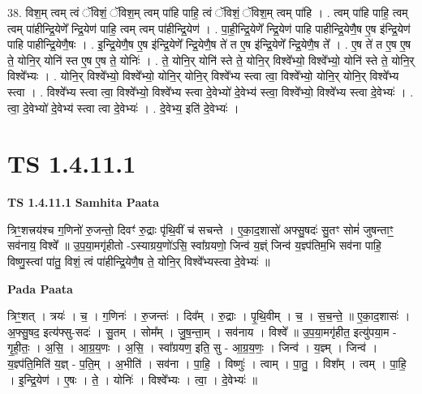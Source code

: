 \documentclass[17pt]{extarticle}
\begin{document}
38. विश॒म् त्वम् त्वं ॅविशं॒ ॅविश॒म् त्वम् पा॑हि पाहि॒ त्वं ॅविशं॒ ॅविश॒म् त्वम् पा॑हि । . त्वम् पा॑हि पाहि॒ त्वम् त्वम् पा॑हीन्द्रि॒येणे᳚ न्द्रि॒येण॑ पाहि॒ त्वम् त्वम् पा॑हीन्द्रि॒येण॑ । . पा॒ही॒न्द्रि॒येणे᳚ न्द्रि॒येण॑ पाहि पाहीन्द्रि॒येणै॒ष ए॒ष इ॑न्द्रि॒येण॑ पाहि पाहीन्द्रि॒येणै॒षः । . इ॒न्द्रि॒येणै॒ष ए॒ष इ॑न्द्रि॒येणे᳚ न्द्रि॒येणै॒ष ते॑ त ए॒ष इ॑न्द्रि॒येणे᳚ न्द्रि॒येणै॒ष ते᳚ । . ए॒ष ते॑ त ए॒ष ए॒ष ते॒ योनि॒र् योनि॑ स्त ए॒ष ए॒ष ते॒ योनिः॑ । . ते॒ योनि॒र् योनि॑ स्ते ते॒ योनि॒र् विश्वे᳚भ्यो॒ विश्वे᳚भ्यो॒ योनि॑ स्ते ते॒ योनि॒र् विश्वे᳚भ्यः । . योनि॒र् विश्वे᳚भ्यो॒ विश्वे᳚भ्यो॒ योनि॒र् योनि॒र् विश्वे᳚भ्य स्त्वा त्वा॒ विश्वे᳚भ्यो॒ योनि॒र् योनि॒र् विश्वे᳚भ्य स्त्वा । . विश्वे᳚भ्य स्त्वा त्वा॒ विश्वे᳚भ्यो॒ विश्वे᳚भ्य स्त्वा दे॒वेभ्यो॑ दे॒वेभ्य॑ स्त्वा॒ विश्वे᳚भ्यो॒ विश्वे᳚भ्य स्त्वा दे॒वेभ्यः॑ । . त्वा॒ दे॒वेभ्यो॑ दे॒वेभ्य॑ स्त्वा त्वा दे॒वेभ्यः॑ । . दे॒वेभ्य॒ इति॑ दे॒वेभ्यः॑ । \newline
\pagebreak
{}
\section*{ TS 1.4.11.1 }

\textbf{TS 1.4.11.1 } \newline
\textbf{Samhita Paata} \newline

त्रिꣳ॒॒शत्त्रय॑श्च ग॒णिनो॑ रु॒जन्तो॒ दिवꣳ॑ रु॒द्राः पृ॑थि॒वीं च॑ सचन्ते । ए॒का॒द॒शासो॑ अफ्सु॒षदः॑ सु॒तꣳ सोमं॑ जुषन्ताꣳ॒॒ सव॑नाय॒ विश्वे᳚ ॥ उ॒प॒या॒मगृ॑हीतो -ऽस्याग्रय॒णो॑ऽसि॒ स्वा᳚ग्रयणो॒ जिन्व॑ य॒ज्ञ्ं जिन्व॑ य॒ज्ञ्प॑तिम॒भि सव॑ना पाहि॒ विष्णु॒स्त्वां पा॑तु॒ विशं॒ त्वं पा॑हीन्द्रि॒येणै॒ष ते॒ योनि॒र् विश्वे᳚भ्यस्त्वा दे॒वेभ्यः॑ ॥ \newline

\textbf{Pada Paata} \newline

त्रिꣳ॒॒शत् । त्रयः॑ । च॒ । ग॒णिनः॑ । रु॒जन्तः॑ । दिव᳚म् । रु॒द्राः । पृ॒थि॒वीम् । च॒ । स॒च॒न्ते॒ ॥ ए॒का॒द॒शासः॑ । अ॒फ्सु॒षद॒ इत्य॑फ्सु-सदः॑ । सु॒तम् । सोम᳚म् । जु॒ष॒न्ता॒म् । सव॑नाय । विश्वे᳚ ॥ उ॒प॒या॒मगृ॑हीत॒ इत्यु॑पया॒म - गृ॒ही॒तः॒ । अ॒सि॒ । आ॒ग्र॒य॒णः । अ॒सि॒ । स्वा᳚ग्रयण॒ इति॒ सु - आ॒ग्र॒य॒णः॒ । जिन्व॑ । य॒ज्ञ्म् । जिन्व॑ । य॒ज्ञ्प॑ति॒मिति॑ य॒ज्ञ् - प॒ति॒म् । अ॒भीति॑ । सव॑ना । पा॒हि॒ । विष्णुः॑ । त्वाम् । पा॒तु॒ । विश᳚म् । त्वम् । पा॒हि॒ । इ॒न्द्रि॒येण॑ । ए॒षः । ते॒ । योनिः॑ । विश्वे᳚भ्यः । त्वा॒ । दे॒वेभ्यः॑ ॥  \newline
\end{document}
